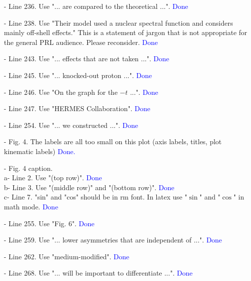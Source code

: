 \documentclass[a4paper,11pt,twoside]{article}
\begin{document}
\begin{enumerate}
- Line 236. Use "... are compared to the theoretical ...".
      \textcolor{blue}{Done}

- Line 238. Use "Their model used a nuclear spectral function and considers 
   mainly off-shell effects." This is a statement of jargon that is not 
   appropriate for the general PRL audience.  Please reconsider.
      \textcolor{blue}{Done}

- Line 243. Use "... effects that are not taken ...".
      \textcolor{blue}{Done}

- Line 245. Use "... knocked-out proton ...".
      \textcolor{blue}{Done}

- Line 246. Use "On the graph for the $-t$ ...".
      \textcolor{blue}{Done}

- Line 247. Use "HERMES Collaboration".
      \textcolor{blue}{Done}

- Line 254. Use "... we constructed ...".
      \textcolor{blue}{Done}

- Fig. 4. The labels are all too small on this plot (axis labels, titles, plot 
  kinematic labels)
      \textcolor{blue}{Done.}

- Fig. 4 caption.\\
   a- Line 2. Use "(top row)".
      \textcolor{blue}{Done}\\
   b- Line 3. Use "(middle row)" and "(bottom row)".
      \textcolor{blue}{Done}\\
   c- Line 7. "sin" and "cos" should be in rm font. In latex use "$\sin$" and 
   "$\cos$" in math mode.
      \textcolor{blue}{Done}

- Line 255. Use "Fig. 6".
      \textcolor{blue}{Done}

- Line 259. Use "... lower asymmetries that are independent of ...".
      \textcolor{blue}{Done}

- Line 262. Use "medium-modified".
      \textcolor{blue}{Done}

- Line 268. Use "... will be important to differentiate ...".
      \textcolor{blue}{Done}


\end{enumerate}
\end{document}
